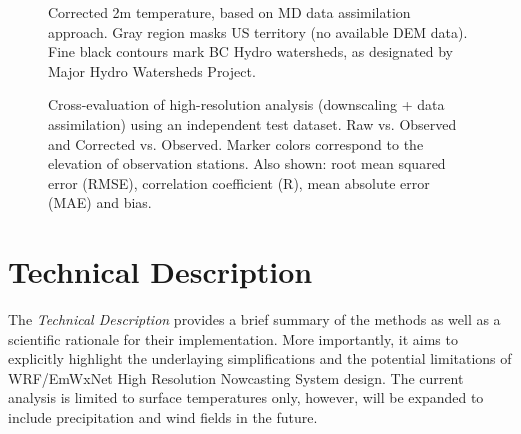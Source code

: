 \documentclass{article}
\begin{document}
\begin{landscape}
\begin{figure}
\caption{Corrected 2m temperature, based on MD data assimilation approach. Gray region masks US territory (no available DEM data). Fine black contours mark BC Hydro watersheds, as designated by Major Hydro Watersheds Project.}\label{fig:correctedT}
\end{figure}

\begin{figure}
\caption{Cross-evaluation of high-resolution analysis (downscaling + data assimilation) using an independent test dataset. Raw vs. Observed and Corrected vs. Observed. Marker colors correspond to the elevation of observation stations. Also shown: root mean squared error (RMSE), correlation coefficient (R), mean absolute error (MAE) and bias. }\label{fig:verifDA}
\end{figure}

\end{landscape}
\restoregeometry
\pagestyle{plain}
\FloatBarrier

\newpage
\section{Technical Description}
The \emph{Technical Description} provides a brief summary of the methods as well as a scientific rationale for their implementation. More importantly, it aims to explicitly highlight the underlaying simplifications and the potential limitations of WRF/EmWxNet High Resolution Nowcasting System design. The current analysis is limited to surface temperatures only, however, will be expanded to include precipitation and wind fields in the future. 
\end{document}
